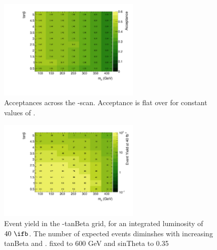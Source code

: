 \begin{figure}
\centering
\includegraphics[width=0.6\textwidth]{texinputs/04_grid/figures/monoz/leptonic/tanbma_ae_ll.pdf}
\caption{Acceptances across the \ma-\tanb scan.  Acceptance is flat over \tanb for constant values of \ma.}
\label{fig:monoz_ll_tanbma_acceptance}
\end{figure}

\begin{figure}
\centering
\includegraphics[width=0.6\textwidth]{texinputs/04_grid/figures/monoz/leptonic/tanbma_yield_ll.pdf}
\caption{Event yield in the \ma-tanBeta grid, for an integrated luminosity of $40~\ifb$.  The number of expected events diminshes with increasing tanBeta and \ma.  \mA fixed to 600 GeV and sinTheta to 0.35}
\label{fig:monoz_ll_tanbma_yield}
\end{figure}
